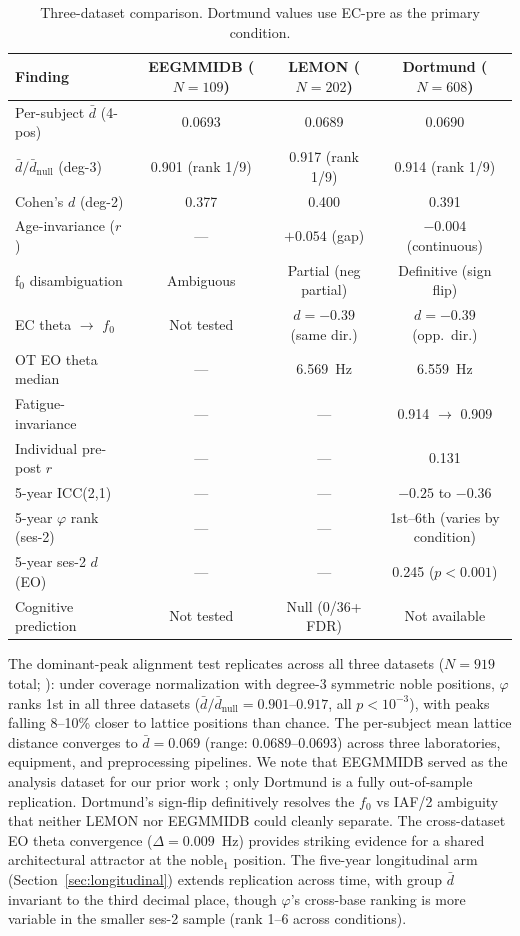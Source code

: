 \documentclass[11pt,a4paper]{article}
\newcommand{\phisym}{\varphi}
\newcommand{\fzero}{f_0}
\begin{document}
\begin{table}[H]
\centering
\caption{Three-dataset comparison. Dortmund values use EC-pre as the primary condition.}
\begin{tabular}{lccc}
\toprule
Finding & EEGMMIDB ($N = 109$) & LEMON ($N = 202$) & Dortmund ($N = 608$) \\
\midrule
Per-subject $\bar{d}$ (4-pos) & 0.0693 & 0.0689 & 0.0690 \\
$\bar{d}/\bar{d}_{\text{null}}$ (deg-3) & 0.901 (rank 1/9) & 0.917 (rank 1/9) & 0.914 (rank 1/9) \\
Cohen's $d$ (deg-2) & 0.377 & 0.400 & 0.391 \\
Age-invariance ($r$) & --- & $+0.054$ (gap) & $-0.004$ (continuous) \\
f$_0$ disambiguation & Ambiguous & Partial (neg partial) & Definitive (sign flip) \\
EC theta $\to$ $\fzero$ & Not tested & $d = -0.39$ (same dir.) & $d = -0.39$ (opp.\ dir.) \\
OT EO theta median & --- & 6.569~Hz & 6.559~Hz \\
Fatigue-invariance & --- & --- & 0.914 $\to$ 0.909 \\
Individual pre-post $r$ & --- & --- & 0.131 \\
5-year ICC(2,1) & --- & --- & $-0.25$ to $-0.36$ \\
5-year $\phisym$ rank (ses-2) & --- & --- & 1st--6th (varies by condition) \\
5-year ses-2 $d$ (EO) & --- & --- & 0.245 ($p < 0.001$) \\
Cognitive prediction & Not tested & Null (0/36+ FDR) & Not available \\
\bottomrule
\end{tabular}
\end{table}

The dominant-peak alignment test replicates across all three datasets ($N = 919$ total; \cite{Babayan2019, Schalk2004, Goldberger2000, GudiMindermann2024}): under coverage normalization with degree-3 symmetric noble positions, $\phisym$ ranks 1st in all three datasets ($\bar{d}/\bar{d}_{\text{null}} = 0.901$--$0.917$, all $p < 10^{-3}$), with peaks falling 8--10\% closer to lattice positions than chance. The per-subject mean lattice distance converges to $\bar{d} = 0.069$ (range: 0.0689--0.0693) across three laboratories, equipment, and preprocessing pipelines. We note that EEGMMIDB served as the analysis dataset for our prior work \parencite{Lacy2026paper2}; only Dortmund is a fully out-of-sample replication. Dortmund's sign-flip definitively resolves the $\fzero$ vs IAF/2 ambiguity that neither LEMON nor EEGMMIDB could cleanly separate. The cross-dataset EO theta convergence ($\Delta = 0.009$~Hz) provides striking evidence for a shared architectural attractor at the noble$_1$ position. The five-year longitudinal arm (Section~\ref{sec:longitudinal}) extends replication across time, with group $\bar{d}$ invariant to the third decimal place, though $\phisym$'s cross-base ranking is more variable in the smaller ses-2 sample (rank 1--6 across conditions).
\end{document}
